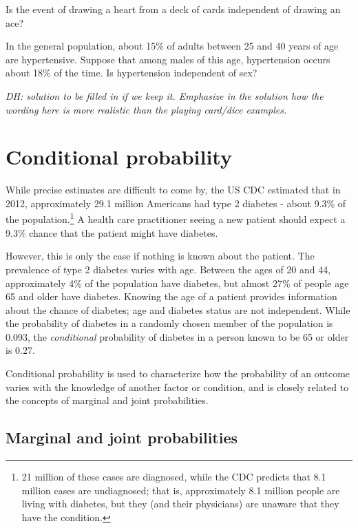\begin{doublespace}
\begin{example}{Is the event of drawing a heart from a deck of cards independent of drawing an ace?}
\end{example}

\begin{example}
 {In the general population, about 15\% of adults between 25 and 40  years of age are hypertensive.  Suppose that among males of this age, hypertension occurs about 18\% of the time.  Is hypertension independent of sex?} 

 \textit{DH: solution to be filled in if we keep it.  Emphasize in the solution how the wording here is more realistic than the playing card/dice examples.}
\end{example}



\section{Conditional probability}
\label{conditionalProbabilitySection}

While precise estimates are difficult to come by, the US CDC estimated that in 2012, approximately 29.1 million Americans had type 2 diabetes - about 9.3\% of the population.\footnote{21 million of these cases are diagnosed, while the CDC predicts that 8.1 million cases are undiagnosed; that is, approximately 8.1 million people are living with diabetes, but they (and their physicians) are unaware that they have the condition.} A health care practitioner seeing a new patient should expect a 9.3\% chance that the patient might have diabetes. 

However, this is only the case if nothing is known about the patient. The prevalence of type 2 diabetes varies with age. Between the ages of 20 and 44, approximately 4\% of the population have diabetes, but almost 27\% of people age 65 and older have diabetes. Knowing the age of a patient provides information about the chance of diabetes; age and diabetes status are not independent. While the probability of diabetes in a randomly chosen member of the population is 0.093, the \textit{conditional} probability of diabetes in a person known to be 65 or older is 0.27.

Conditional probability is used to  characterize how the probability of an outcome varies with the knowledge of another factor or condition, and is closely related to the concepts of marginal and joint probabilities.


\subsection{Marginal and joint probabilities}
\label{marginalAndJointProbabilities}


\end{doublespace}
